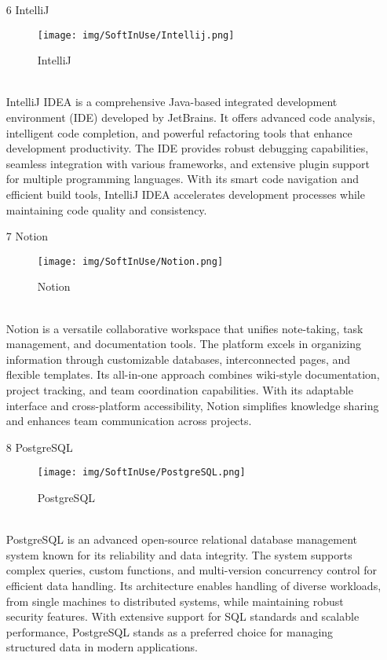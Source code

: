 \documentclass[conference]{IEEEtran}
\begin{document}
\begin{enumerate}
\begin{itemize}
\begin{itemize}
\begin{enumerate}
\begin{enumerate}
\item[6] IntelliJ
\begin{figure}[h]
\centering
\texttt{[image: img/SoftInUse/Intellij.png]}
\caption{IntelliJ} 
\end{figure}\\
IntelliJ IDEA is a comprehensive Java-based integrated development environment (IDE) developed by JetBrains. It offers advanced code analysis, intelligent code completion, and powerful refactoring tools that enhance development productivity. The IDE provides robust debugging capabilities, seamless integration with various frameworks, and extensive plugin support for multiple programming languages. With its smart code navigation and efficient build tools, IntelliJ IDEA accelerates development processes while maintaining code quality and consistency.\\

\item[7] Notion
\begin{figure}[h]
\centering
\texttt{[image: img/SoftInUse/Notion.png]}
\caption{Notion} 
\end{figure}\\
Notion is a versatile collaborative workspace that unifies note-taking, task management, and documentation tools. The platform excels in organizing information through customizable databases, interconnected pages, and flexible templates. Its all-in-one approach combines wiki-style documentation, project tracking, and team coordination capabilities. With its adaptable interface and cross-platform accessibility, Notion simplifies knowledge sharing and enhances team communication across projects.\\

\item[8] PostgreSQL
\begin{figure}[h]
\centering
\texttt{[image: img/SoftInUse/PostgreSQL.png]}
\caption{PostgreSQL} 
\end{figure}\\
PostgreSQL is an advanced open-source relational database management system known for its reliability and data integrity. The system supports complex queries, custom functions, and multi-version concurrency control for efficient data handling. Its architecture enables handling of diverse workloads, from single machines to distributed systems, while maintaining robust security features. With extensive support for SQL standards and scalable performance, PostgreSQL stands as a preferred choice for managing structured data in modern applications.\\


\end{enumerate}
\end{enumerate}
\end{itemize}
\end{itemize}
\end{enumerate}
\end{document}
